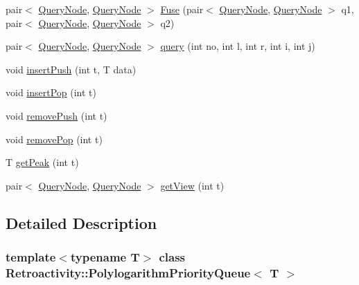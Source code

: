 \begin{DoxyCompactItemize}
\item 
pair$<$ \hyperlink{classRetroactivity_1_1PolylogarithmPriorityQueue_1_1QueryNode}{Query\+Node}, \hyperlink{classRetroactivity_1_1PolylogarithmPriorityQueue_1_1QueryNode}{Query\+Node} $>$ \hyperlink{classRetroactivity_1_1PolylogarithmPriorityQueue_a4b505ade995caff1cdf8c037f492b067}{Fuse} (pair$<$ \hyperlink{classRetroactivity_1_1PolylogarithmPriorityQueue_1_1QueryNode}{Query\+Node}, \hyperlink{classRetroactivity_1_1PolylogarithmPriorityQueue_1_1QueryNode}{Query\+Node} $>$ q1, pair$<$ \hyperlink{classRetroactivity_1_1PolylogarithmPriorityQueue_1_1QueryNode}{Query\+Node}, \hyperlink{classRetroactivity_1_1PolylogarithmPriorityQueue_1_1QueryNode}{Query\+Node} $>$ q2)
\item 
pair$<$ \hyperlink{classRetroactivity_1_1PolylogarithmPriorityQueue_1_1QueryNode}{Query\+Node}, \hyperlink{classRetroactivity_1_1PolylogarithmPriorityQueue_1_1QueryNode}{Query\+Node} $>$ \hyperlink{classRetroactivity_1_1PolylogarithmPriorityQueue_a464b4358858dcf25a9d4b2c4b3893218}{query} (int no, int l, int r, int i, int j)
\item 
void \hyperlink{classRetroactivity_1_1PolylogarithmPriorityQueue_aa93c676dc292c42fc528ade916476b77}{insert\+Push} (int t, T data)
\item 
void \hyperlink{classRetroactivity_1_1PolylogarithmPriorityQueue_a67192a84402c55ac9d1ed46b424e5bd9}{insert\+Pop} (int t)
\item 
void \hyperlink{classRetroactivity_1_1PolylogarithmPriorityQueue_ad19cb99726304b5b47213f28e23d24fc}{remove\+Push} (int t)
\item 
void \hyperlink{classRetroactivity_1_1PolylogarithmPriorityQueue_acd4a4c7183bcc14a5532818fc772c08b}{remove\+Pop} (int t)
\item 
T \hyperlink{classRetroactivity_1_1PolylogarithmPriorityQueue_ab1473c2314768fd86a727cca9507121b}{get\+Peak} (int t)
\item 
pair$<$ \hyperlink{classRetroactivity_1_1PolylogarithmPriorityQueue_1_1QueryNode}{Query\+Node}, \hyperlink{classRetroactivity_1_1PolylogarithmPriorityQueue_1_1QueryNode}{Query\+Node} $>$ \hyperlink{classRetroactivity_1_1PolylogarithmPriorityQueue_a63c8782f290dd5ae66259401dcbf8e40}{get\+View} (int t)
\end{DoxyCompactItemize}


\subsection{Detailed Description}
\subsubsection*{template$<$typename T$>$\newline
class Retroactivity\+::\+Polylogarithm\+Priority\+Queue$<$ T $>$}

